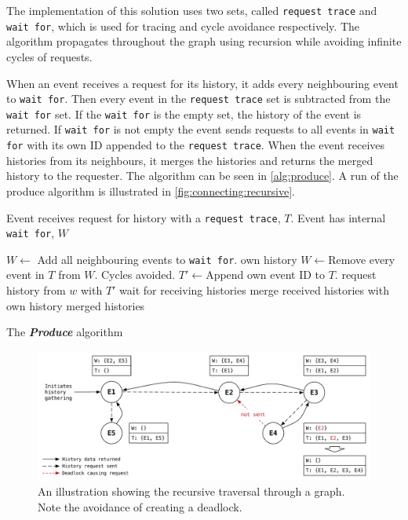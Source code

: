 	\newpar The implementation of this solution uses two sets, called \texttt{request trace} and \texttt{wait for}, which is used for tracing and cycle avoidance respectively. The algorithm propagates throughout the graph using recursion while avoiding infinite cycles of requests. 
	
	When an event receives a request for its history, it adds every neighbouring event to \texttt{wait for}. Then every event in the \texttt{request trace} set is subtracted from the \texttt{wait for} set. If the \texttt{wait for} is the empty set, the history of the event is returned. If \texttt{wait for} is not empty the event sends requests to all events in \texttt{wait for} with its own ID appended to the \texttt{request trace}. When the event receives histories from its neighbours, it merges the histories and returns the merged history to the requester. The algorithm can be seen in \autoref{alg:produce}. A run of the produce algorithm is illustrated in \autoref{fig:connecting:recursive}.
	
	\begin{algorithm}
	\begin{algorithmic}
		\State Event receives request for history with a \texttt{request trace}, $T$.
		\State Event has internal \texttt{wait for}, $W$
		\State
		
			\State $W\gets$ \Comment Add all neighbouring events to \texttt{wait for}.
				\Return own history
			\Else
				\State $W\gets$\Comment Remove every event in $T$ from $W$. Cycles avoided.
				\State $T'\gets$\Comment Append own event ID to $T$.
				\State
					\State request history from $w$ with $T'$
				\EndFor
				\State wait for receiving histories
				\State merge received histories with own history
				\State
				\Return merged histories
			\EndIf
		\EndFunction
	\end{algorithmic}
	\caption{The \textit{\textbf{Produce}} algorithm}
	\label{alg:produce}
	\end{algorithm}
		
	\begin{figure}[H]
		\centering
		\includegraphics[width=\textwidth]{4connect/images/recursive.pdf}
		\caption{An illustration showing the recursive traversal through a graph. Note the avoidance of creating a deadlock.}
		\label{fig:connecting:recursive}
	\end{figure}
		
